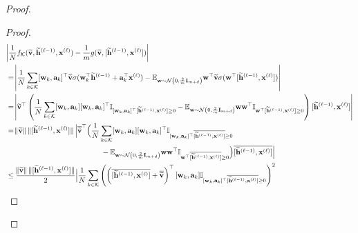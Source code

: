 \begin{proof}
\begin{proof}
		\begingroup
		\allowdisplaybreaks
		\begin{align}
			& \abs{\frac{1}{N}f_{\mathcal{K}}(\widetilde{\mathbf{v}}, \widetilde{\mathbf{h}}^{(\ell-1)}, \mathbf{x}^{(\ell)}) - \frac{1}{m}g(\widetilde{\mathbf{v}}, [\widetilde{\mathbf{h}}^{(\ell-1)}, \mathbf{x}^{(\ell)}])} \nonumber
			\\& = \abs{\frac{1}{N}  \sum_{k \in \mathcal{K}} [\mathbf{w}_{k}, \mathbf{a}_{k}]^{\top}  \widetilde{\mathbf{v}} \sigma(\mathbf{w}_k^{\top} \widetilde{\mathbf{h}}^{(\ell-1)} + \mathbf{a}_k^{\top} \mathbf{x}^{(\ell)}) -   \mathbb{E}_{\mathbf{w} \sim \mathcal{N}\left(0, \frac{2}{m}\mathbf{I}_{m+d}\right)} \mathbf{w}^{\top} \widetilde{\mathbf{v}} \sigma(\mathbf{w}^{\top} [\widetilde{\mathbf{h}}^{(\ell-1)},  \mathbf{x}^{(\ell)}])} \nonumber\\
			&= \abs{\widetilde{\mathbf{v}}^{\top} \left(\frac{1}{N} \sum_{k \in \mathcal{K}} [\mathbf{w}_{k}, \mathbf{a}_{k}] [\mathbf{w}_{k}, \mathbf{a}_{k}]^{\top}  \mathbb{I}_{[\mathbf{w}_{k}, \mathbf{a}_{k}]^{\top} [\widetilde{\mathbf{h}}^{(\ell-1)}, \mathbf{x}^{(\ell)}] \ge 0} - \mathbb{E}_{\mathbf{w} \sim \mathcal{N}\left(0, \frac{2}{m}\mathbf{I}_{m+d}\right)}  \mathbf{w}\mathbf{w}^{\top}  \mathbb{I}_{\mathbf{w}^{\top} [\widetilde{\mathbf{h}}^{(\ell-1)}, \mathbf{x}^{(\ell)}] \ge 0}\right) [\widetilde{\mathbf{h}}^{(\ell-1)}, \mathbf{x}^{(\ell)}]}  \nonumber\\
			&= \norm{\widetilde{\mathbf{v}}} \norm[0]{[\widetilde{\mathbf{h}}^{(\ell-1)},  \mathbf{x}^{(\ell)}]}\Big|\overline{\widetilde{\mathbf{v}}}^{\top} \Big(\frac{1}{N} \sum_{k \in \mathcal{K}} [\mathbf{w}_{k}, \mathbf{a}_{k}] [\mathbf{w}_{k}, \mathbf{a}_{k}]^{\top}  \mathbb{I}_{[\mathbf{w}_{k}, \mathbf{a}_{k}]^{\top} \overline{[\widetilde{\mathbf{h}}^{(\ell-1)},  \mathbf{x}^{(\ell)}]} \ge 0} 
			\nonumber\\ & \quad\quad\quad\quad\quad\quad\quad\quad\quad\quad\quad\quad\quad
			- \mathbb{E}_{\mathbf{w} \sim \mathcal{N}\left(0, \frac{2}{m}\mathbf{I}_{m+d}\right)}  \mathbf{w}\mathbf{w}^{\top}  \mathbb{I}_{\mathbf{w}^{\top} \overline{[\widetilde{\mathbf{h}}^{(\ell-1)},  \mathbf{x}^{(\ell)}]} \ge 0}\Big) \overline{[\widetilde{\mathbf{h}}^{(\ell-1)},  \mathbf{x}^{(\ell)}]}\Big|  \nonumber\\
			&\le  \frac{\norm{\widetilde{\mathbf{v}}} \norm[0]{[\widetilde{\mathbf{h}}^{(\ell-1)},  \mathbf{x}^{(\ell)}]}}{2}  \Big|\frac{1}{N}\sum_{k \in \mathcal{K}} \left(\left(\overline{[\widetilde{\mathbf{h}}^{(\ell-1)},  \mathbf{x}^{(\ell)}]} + \overline{\widetilde{\mathbf{v}}}\right)^{\top} [\mathbf{w}_{k}, \mathbf{a}_{k}] \mathbb{I}_{[\mathbf{w}_{k}, \mathbf{a}_{k}]^{\top} \overline{[\widetilde{\mathbf{h}}^{(\ell-1)},  \mathbf{x}^{(\ell)}]} \ge 0} \right)^2 \nonumber\\

\end{align}
\end{proof}
\end{proof}
